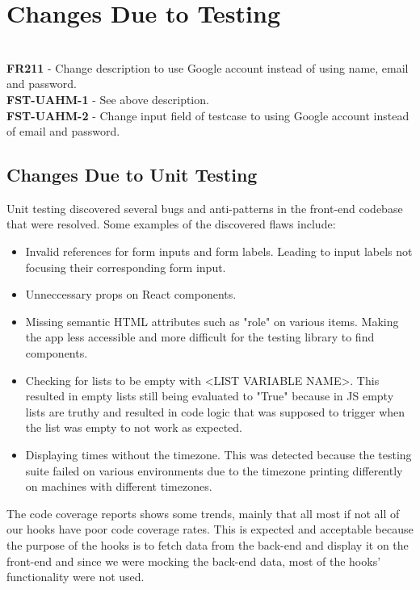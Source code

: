 \documentclass[12pt, titlepage]{article}
\begin{document}
\section{Changes Due to Testing}

\\
\textbf{FR211} - Change description to use Google account instead of using name, email and password.\\
\textbf{FST-UAHM-1} - See above description. \\
\textbf{FST-UAHM-2} - Change input field of testcase to using Google account instead of email and password. \\

\subsection{Changes Due to Unit Testing}
Unit testing discovered several bugs and anti-patterns in the front-end codebase that were resolved. Some examples of the discovered flaws include:
\begin{itemize}
\item Invalid references for form inputs and form labels. Leading to input labels not focusing their corresponding form input.
\item Unneccessary props on React components.
\item Missing semantic HTML attributes such as "role" on various items. Making the app less accessible and more difficult for the testing library to find components.
\item Checking for lists to be empty with <LIST VARIABLE NAME>. This resulted in empty lists still being evaluated to "True" because in JS empty lists are truthy and resulted in code logic that was supposed to trigger when the list was empty to not work as expected.
\item Displaying times without the timezone. This was detected because the testing suite failed on various environments due to the timezone printing differently on machines with different timezones.
\end{itemize}
The code coverage reports shows some trends, mainly that all most if not all of our hooks have poor code coverage rates. This is expected and acceptable because the purpose of the hooks is to fetch data from the back-end and display it on the front-end and since we were mocking the back-end data, most of the hooks' functionality were not used.
\end{document}
